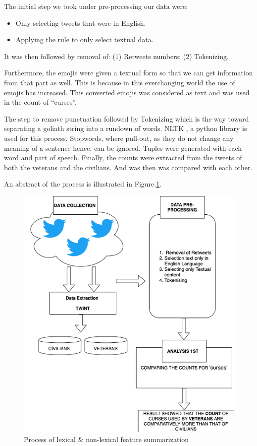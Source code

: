 The initial step we took under pre-processing our data were:

\begin{itemize}
  \item Only selecting tweets that were in English.
  \item Applying the rule to only select textual data.
\end{itemize}

It was then followed by removal of: (1) Retweets numbers; (2) Tokenizing.

Furthermore, the emojis were given a textual form so that we can get information from that part as well. This is because in this everchanging world the use of emojis has increased. This converted emojis was considered as text and was used in the count of “curses”.

The step to remove punctuation followed by Tokenizing which is the way toward separating a goliath string into a rundown of words. NLTK \citep{NLTK}, a python library is used for this process. Stopwords, where pull-out, as they do not change any meaning of a sentence hence, can be ignored. Tuples were generated with each word and part of speech. Finally, the counts were extracted from the tweets of both the veterans and the civilians. And was then was compared with each other.

An abstract of the process is illustrated in Figure.\ref{fig:exp1}.

\begin{figure}[h]
  \centering
  \includegraphics{images/exp1process.png}
  \caption{Process of lexical \& non-lexical feature summarization}
  \label{fig:exp1}
\end{figure}

